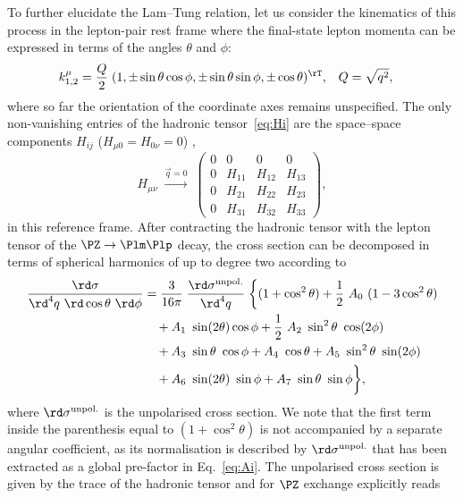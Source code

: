 To further elucidate the Lam--Tung relation, let us consider the kinematics of this process in
the lepton-pair rest frame where the final-state lepton momenta can be expressed in terms of the angles $\theta$ and $\phi$:
\begin{align}
  k^\mu_{1,2} &= \frac{Q}{2} \; (1, \pm\sin\theta \cos\phi, \pm\sin\theta \sin\phi, \pm\cos\theta)^\rT , &
  Q &= \sqrt{q^2} ,
\end{align}
where so far the orientation of the coordinate axes remains unspecified.
The only non-vanishing entries of the hadronic tensor~\eqref{eq:Hi} are the space--space components $H_{ij}$ ($H_{\mu 0} = H_{0 \nu} = 0$) ,
\begin{equation}
  H_{\mu\nu} \;\xrightarrow{\vec{q}=0}\; 
  \begin{pmatrix}
  0 & 0 & 0 & 0 \\
  0 & H_{11} & H_{12} & H_{13} \\
  0 & H_{21} & H_{22} & H_{23} \\
  0 & H_{31} & H_{32} & H_{33} 
  \end{pmatrix} ,
\end{equation}
in this reference frame.
After contracting the hadronic tensor with the lepton tensor of the $\PZ\to\Plm\Plp$ decay, the cross section can be decomposed in terms of spherical harmonics of up to degree two according to
\begin{align} 
  \frac{ \rd\sigma}{\rd^4q~\rd\cos\theta~\rd\phi} &= 
  \frac{3}{16 \pi} \; \frac{\rd\sigma^\mathrm{unpol.}}{\rd^4q}  
  \; \bigg\{ 
  (1 + \cos^2\theta) 
  + \frac{1}{2}\ A_0 \ (1 - 3 \cos^2\theta)  \nonumber \\ & \quad
  + A_1 \ \sin (2 \theta) \cos\phi  
  + \frac{1}{2}\ A_2 \ \sin^2\theta\ \cos (2 \phi)  \nonumber \\ & \quad
  + A_3 \ \sin \theta\ \cos \phi 
  + A_4 \ \cos\theta  
  + A_5 \ \sin^2\theta \ \sin (2 \phi)  \nonumber \\ & \quad
  + A_6 \ \sin (2 \theta)\ \sin \phi 
  + A_7 \ \sin \theta \ \sin \phi 
  \bigg\} ,
  \label{eq:Ai}
\end{align}
where $\rd\sigma^\mathrm{unpol.}$ is the unpolarised cross section. 
We note that the first term inside the parenthesis equal to $(1 + \cos^2\theta)$ is not accompanied by a separate angular coefficient, as its normalisation is described by $\rd\sigma^\mathrm{unpol.}$ that has been extracted as a global pre-factor in Eq.~\eqref{eq:Ai}.
The unpolarised cross section is given by the trace of the hadronic tensor and for $\PZ$ exchange explicitly reads

